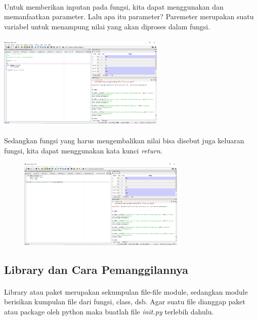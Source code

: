 \paragraph{}
    Untuk memberikan inputan pada fungsi, kita dapat menggunakan dan memanfaatkan parameter. Lalu apa itu parameter? Paremeter merupakan suatu variabel untuk menampung nilai yang akan diproses dalam fungsi.

\paragraph{}
\centerline{\includegraphics[width=8cm]{figures/inputanfungsi.PNG}}
\paragraph{}
    Sedangkan fungsi yang harus mengembalikan nilai bisa disebut juga keluaran fungsi, kita dapat menggunakan kata kunci \textit{return}.

\begin{figure}[h]
\centerline{\includegraphics[width=8cm]{figures/keluaranfungsi.PNG}}
\end{figure}

\subsection{Library dan Cara Pemanggilannya}
\paragraph{}
    Library atau paket merupakan sekumpulan file-file module, sedangkan module berisikan kumpulan file dari fungsi, class, dsb. Agar suatu file dianggap paket atau package oleh python maka buatlah file \textit{init.py} terlebih dahulu.


